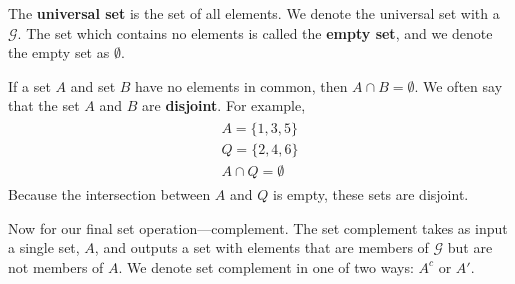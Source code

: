 The \textbf{universal set} is the set of all elements. 
We denote the universal set with a $\mathcal{G}$.
The set which contains no elements is called the \textbf{empty set}, and we denote the empty set as $\emptyset$.

If a set $A$ and set $B$ have no elements in common, then $A \cap B = \emptyset$.
We often say that the set $A$ and $B$ are \textbf{disjoint}.
For example, 
\begin{align}
    \begin{aligned}
       A = \{ 1,3,5 \} \\
       Q = \{ 2,4,6 \} \\
       A \cap Q = \emptyset
    \end{aligned}
\end{align}
Because the intersection between $A$ and $Q$ is empty, these sets are disjoint.

Now for our final set operation---complement.
The set complement takes as input a single set, $A$, and outputs a set with elements that are members of $\mathcal{G}$ but are not members of $A$.
We denote set complement in one of two ways: $A^{c}$ or $A'$.

